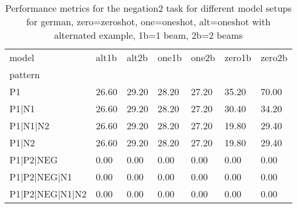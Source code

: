 \begin{table}[h]
\begin{tabular}{l|llllll}
\toprule
model & alt1b & alt2b & one1b & one2b & zero1b & zero2b \\
pattern &  &  &  &  &  &  \\
\midrule
P1 & 26.60 & 29.20 & 28.20 & 27.20 & 35.20 & 70.00 \\
P1|N1 & 26.60 & 29.20 & 28.20 & 27.20 & 30.40 & 34.20 \\
P1|N1|N2 & 26.60 & 29.20 & 28.20 & 27.20 & 19.80 & 29.40 \\
P1|N2 & 26.60 & 29.20 & 28.20 & 27.20 & 19.80 & 29.40 \\
P1|P2|NEG & 0.00 & 0.00 & 0.00 & 0.00 & 0.00 & 0.00 \\
P1|P2|NEG|N1 & 0.00 & 0.00 & 0.00 & 0.00 & 0.00 & 0.00 \\
P1|P2|NEG|N1|N2 & 0.00 & 0.00 & 0.00 & 0.00 & 0.00 & 0.00 \\
\bottomrule
\end{tabular}
\caption{Performance metrics for the negation2 task for different model setups for german, zero=zeroshot, one=oneshot, alt=oneshot with alternated example, 1b=1 beam, 2b=2 beams}
\label{tab:de_negation2_performance}
\end{table}
